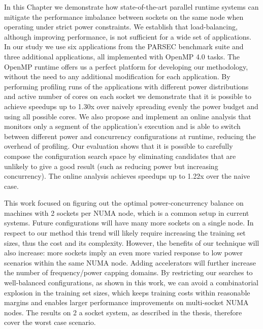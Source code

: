 In this Chapter we demonstrate how state-of-the-art parallel runtime systems can mitigate the performance imbalance between sockets on the same node when
operating under strict power constraints.  We establish that load-balancing, although improving performance, is not sufficient for a wide set of applications.  In our study
we use six applications from the PARSEC benchmark suite and three additional applications, all implemented with OpenMP 4.0 tasks.
The OpenMP runtime offers us a perfect platform for developing our methodology, without the need to
any additional modification for each application.
By performing profiling runs of 
the applications with different power distributions and active number of cores on each socket we demonstrate that it is possible to achieve speedups up to 1.30x over
naively spreading evenly the power budget and using all possible cores.
%
We also propose and implement an online analysis that monitors only a segment of the application's execution and is able to
switch between different power and concurrency configurations at runtime, reducing the overhead of profiling.  
Our evaluation shows that it is possible to carefully compose the configuration search space by eliminating candidates that are unlikely to give a good result (such as reducing
power but increasing concurrency). 
The online analysis achieves speedups up to 1.22x over the naive case.

This work focused on figuring out the optimal power-concurrency balance on machines with 2 sockets per NUMA
node, which is a common setup in current systems. Future configurations will have many more sockets on a single node. 
In respect to our method this trend will likely require increasing the training set sizes, thus the cost and its complexity. 
However, the benefits of our technique will also increase: more sockets imply an even more varied response to low power scenarios within the same NUMA node.
Adding accelerators will further increase the number of frequency/power capping domains. By restricting our searches to well-balanced configurations, as shown 
in this work, we can avoid a combinatorial explosion in the training set sizes, which keeps training costs within reasonable margins and enables larger performance 
improvements on multi-socket NUMA nodes. The results on 2 a socket system, as described in the thesis, therefore cover the worst case scenario.

 
